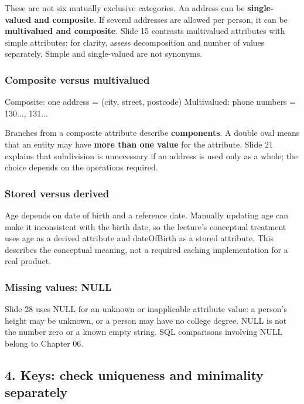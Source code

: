 These are not six mutually exclusive categories. An address can be \textbf{single-valued and composite}. If several addresses are allowed per person, it can be \textbf{multivalued and composite}. Slide 15 contrasts multivalued attributes with simple attributes; for clarity, assess decomposition and number of values separately. Simple and single-valued are not synonyms.

\subsubsection{Composite versus multivalued}\label{02_er_modelling_en-composite-versus-multivalued}

\begin{StudyCode}
Composite:   one address = (city, street, postcode)
Multivalued: phone numbers = {130..., 131...}
\end{StudyCode}

Branches from a composite attribute describe \textbf{components}. A double oval means that an entity may have \textbf{more than one value} for the attribute. Slide 21 explains that subdivision is unnecessary if an address is used only as a whole; the choice depends on the operations required.

\subsubsection{Stored versus derived}\label{02_er_modelling_en-stored-versus-derived}

Age depends on date of birth and a reference date. Manually updating age can make it inconsistent with the birth date, so the lecture's conceptual treatment uses age as a derived attribute and dateOfBirth as a stored attribute. This describes the conceptual meaning, not a required caching implementation for a real product.

\subsubsection{Missing values: NULL}\label{02_er_modelling_en-missing-values-null}

Slide 28 uses NULL for an unknown or inapplicable attribute value: a person's height may be unknown, or a person may have no college degree. NULL is not the number zero or a known empty string. SQL comparisons involving NULL belong to Chapter 06.

\subsection{4. Keys: check uniqueness and minimality separately}\label{02_er_modelling_en-keys-check-uniqueness-and-minimality-separately}

